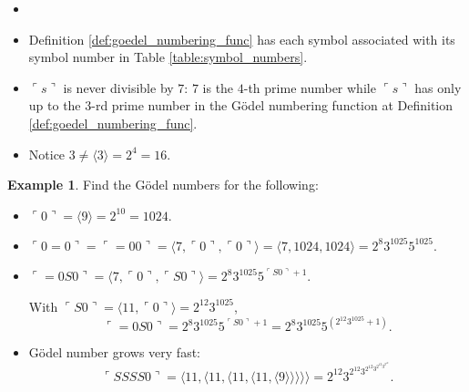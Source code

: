 \documentclass[11pt,letterpaper]{book}
\theoremstyle{definition}
\newtheorem{example}{Example}[section]
\begin{document}
\begin{itemize}
\item[]
\item{Definition \ref{def:goedel_numbering_func} has each symbol associated
with its symbol number in Table \ref{table:symbol_numbers}.}
\item{$\ulcorner s \urcorner $ is never divisible by $7$: $7$ is the $4$-th prime number while $\ulcorner s \urcorner $ has only up to the $3$-rd prime number in the G\"odel numbering function at Definition \ref{def:goedel_numbering_func}. }
\item{Notice $3 \neq \langle 3 \rangle = 2^4 = 16$.}
\end{itemize}


\begin{example}
Find the G\"odel numbers for the following:
\begin{itemize}
\item{$ \ulcorner 0 \urcorner = \langle 9 \rangle = 2^{10} = 1024 .$}
\item{$ \ulcorner 0 = 0 \urcorner = \ulcorner = 0 0 \urcorner = \langle 7,
\ulcorner 0 \urcorner, \ulcorner 0 \urcorner \rangle = \langle 7, 1024, 1024 \rangle = 2^8
3^{1025} 5^{1025} $.}
\item{$ \ulcorner =0S0 \urcorner = \langle 7, \ulcorner 0 \urcorner, \ulcorner S0
\urcorner \rangle = 2^8 3^{1025} 5^{\ulcorner S0 \urcorner + 1} $.

With $\ulcorner S0 \urcorner = \langle 11, \ulcorner 0 \urcorner \rangle = 2^{12}
3^{1025}$,
$$ \ulcorner =0S0 \urcorner =  2^8 3^{1025} 5^{\ulcorner S0 \urcorner +
1} =  2^8 3^{1025} 5^{(2^{12} 3^{1025} + 1)}. $$
}
\item{G\"odel number grows very fast:
$$\ulcorner S S S S 0 \urcorner = \langle 11, \langle 11, \langle 11, \langle 11, \langle 9 \rangle \rangle \rangle \rangle  \rangle = 2^{12} 3^{ 2^{12} 3^{ 2^{12} 3^{ 2^{12} 3^{2^{10}} } }  } . $$
}
\end{itemize}
\end{example}
\end{document}

